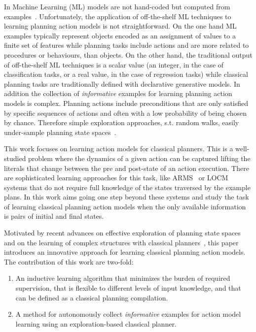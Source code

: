 \documentclass[letterpaper]{article} %
\begin{document}
In Machine Learning (ML) models are not hand-coded but computed from examples~\cite{michalski2013machine}. Unfortunately, the application of off-the-shelf ML techniques to learning planning action models is not straightforward. On the one hand ML examples typically represent objects encoded as an assignment of values to a finite set of features while planning tasks include actions and are more related to procedures or behaviours, than objects. On the other hand, the traditional output of off-the-shelf ML techniques is a scalar value (an integer, in the case of classification tasks, or a real value, in the case of regression tasks) while classical planning tasks are traditionally defined with declarative generative models. In addition the collection of {\em informative} examples for learning planning action models is complex. Planning actions include preconditions that are only satisfied by specific sequences of actions and often with a low probability of being chosen by chance. Therefore simple exploration approaches, s.t. random walks, easily under-sample planning state spaces~\cite{fern2004learning}.

This work focuses on learning action models for classical planners. This is a well-studied problem where the dynamics of a given action can be captured lifting the literals that change between the pre and post-state of an action execution. There are sophisticated learning approaches for this task, like ARMS~\cite{yang2007learning} or LOCM~\cite{cresswell2013acquiring} systems that do not require full knowledge of the states traversed by the example plans. In this work aims going one step beyond these systems and study the task of learning classical planning action models when the only available information is pairs of initial and final states.

Motivated by recent advances on effective exploration of planning state spaces~\cite{} and on the learning of complex structures with classical planners~\cite{segovia2017unsupervised}, this paper introduces an innovative approach for learning classical planning action models. The contribution of this work are two-fold:
\begin{enumerate}
\item An inductive learning algorithm that minimizes the burden of required supervision, that is flexible to different levels of input knowledge, and that can be defined as a classical planning compilation. 
\item A method for autonomously collect {\em informative} examples for action model learning using an exploration-based classical planner.
\end{enumerate}
\end{document}
